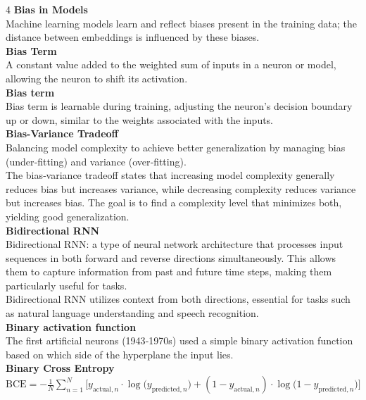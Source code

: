 \documentclass[8pt]{extarticle}
\begin{document}
\begin{multicols}{4}
\vspace{2pt}\textbf{Bias in Models}\\
Machine learning models learn and reflect biases present in the training data; the distance between embeddings is influenced by these biases.\\
\vspace{2pt}\textbf{Bias Term}\\
A constant value added to the weighted sum of inputs in a neuron or model, allowing the neuron to shift its activation.\\
\vspace{2pt}\textbf{Bias term}\\
Bias term is learnable during training, adjusting the neuron's decision boundary up or down, similar to the weights associated with the inputs.\\
\vspace{2pt}\textbf{Bias-Variance Tradeoff}\\
Balancing model complexity to achieve better generalization by managing bias (under‑fitting) and variance (over‑fitting).\\
The bias‑variance tradeoff states that increasing model complexity generally reduces bias but increases variance, while decreasing complexity reduces variance but increases bias. The goal is to find a complexity level that minimizes both, yielding good generalization.\\
\vspace{2pt}\textbf{Bidirectional RNN}\\
Bidirectional RNN: a type of neural network architecture that processes input sequences in both forward and reverse directions simultaneously. This allows them to capture information from past and future time steps, making them particularly useful for tasks.\\
Bidirectional RNN utilizes context from both directions, essential for tasks such as natural language understanding and speech recognition.\\
\vspace{2pt}\textbf{Binary activation function}\\
The first artificial neurons (1943‑1970s) used a simple binary activation function based on which side of the hyperplane the input lies.\\
\vspace{2pt}\textbf{Binary Cross Entropy}\\
$ \text{BCE} = -\frac{1}{N}\sum_{n=1}^{N}\big[ y_{\text{actual},n}\cdot\log\big(y_{\text{predicted},n}\big) + (1 - y_{\text{actual},n})\cdot\log\big(1 - y_{\text{predicted},n}\big) \big] $\\

\end{multicols}
\end{document}
